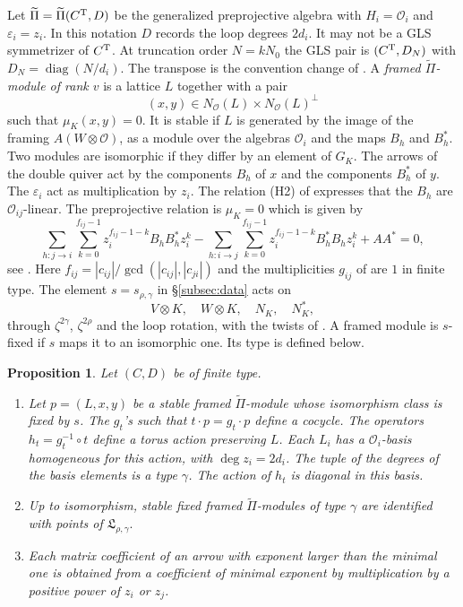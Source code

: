 \documentclass[11pt,reqno]{amsart}
\newtheorem{Proposition}[Theorem]{Proposition}
\theoremstyle{definition}
\theoremstyle{remark}
\providecommand{\calO}{\mathcal O}
\begin{document}
Let $\widetilde\Pi=\widetilde\Pi(C^{\rm T},D)$ be the generalized preprojective
algebra with $H_i=\calO_i$ and $\varepsilon_i=z_i$.
In this notation $D$ records the loop degrees $2d_i$. It may not
be a GLS symmetrizer of $C^{\rm T}$. At truncation order
$N=kN_0$ the GLS pair is $(C^{\rm T},D_N)$ with
$D_N=\operatorname{diag}(N/d_i)$.
The transpose is the
convention change of \cite[Rem.~2.1]{NW23}. 
A \emph{framed $\widetilde\Pi$-module of rank $v$} is a lattice $L$ together with 
a pair $$(x,y)\in N_\calO(L)\times N_\calO(L)^\perp$$ such
that $\mu_K(x,y)=0$. It is {stable} if $L$ is generated by the image of the framing $A(W\otimes\calO)$, 
as a module over the algebras $\calO_i$ and the maps $B_h$ and $B^*_h$.
Two modules are isomorphic if they differ by an element of $G_K$.
The arrows of the double quiver act by the components $B_h$ of $x$ and the 
components $B^*_h$ of $y$. 
The $\varepsilon_i$ act as multiplication by $z_i$.
The relation (H2) of \cite{GLS} expresses that the $B_h$ are $\calO_{ij}$-linear. 
The preprojective relation is $\mu_K=0$ which is given by
\[
\sum_{h:j\to i}\sum_{k=0}^{f_{ij}-1}z_i^{f_{ij}-1-k}B_hB_h^*z_i^k-\sum_{h:i\to j}\sum_{k=0}^{f_{ij}-1}z_i^{f_{ij}-1-k}B^*_hB_hz_i^k+AA^*=0,
\]
see \cite[\S2]{NW23}. 
Here $f_{ij}=|c_{ij}|/\gcd(|c_{ij}|,|c_{ji}|)$ and the
multiplicities $g_{ij}$ of \cite{GLS} are $1$ in finite type.
The element $s=s_{\rho,\gamma}$ in \S\ref{subsec:data} acts on 
$$V\otimes K,\quad W\otimes K,\quad N_K,\quad N_K^*,$$
through $\zeta^{2\gamma}$, $\zeta^{2\rho}$ and the loop rotation, with the
twists of \cite[(3.1.5), (3.1.6)]{VVsh}. 
A framed module is {$s$-fixed} if $s$ maps it to an isomorphic one.
Its {type} is defined below.

\begin{Proposition}\label{prop:ns-modules}
Let $(C,D)$ be of finite type. 
\begin{enumerate}[label=$\mathrm{(\alph*)}$,leftmargin=8mm]
\item Let $p=(L,x,y)$ be a stable framed $\widetilde\Pi$-module whose
isomorphism class is fixed by $s$. The $g_t$'s such that $t\cdot p=g_t\cdot p$ define a cocycle.
The operators $h_t=g_t^{-1}\circ t$ define a  torus
action preserving $L$. Each $L_i$ has a $\calO_i$-basis homogeneous
for this action, with $\deg z_i=2d_i$. 
The tuple of the degrees of the basis elements is a type $\gamma$. 
The action of $h_t$ is diagonal in this basis.
\item 
Up to isomorphism, stable fixed framed $\widetilde\Pi$-modules of type $\gamma$
are identified with points of $\mathfrak L_{\rho,\gamma}.$
\item Each matrix coefficient of an arrow with exponent larger than the
minimal one is obtained from a coefficient of minimal
exponent by multiplication by a positive power of $z_i$ or $z_j$.
\end{enumerate}
\end{Proposition}
\end{document}
